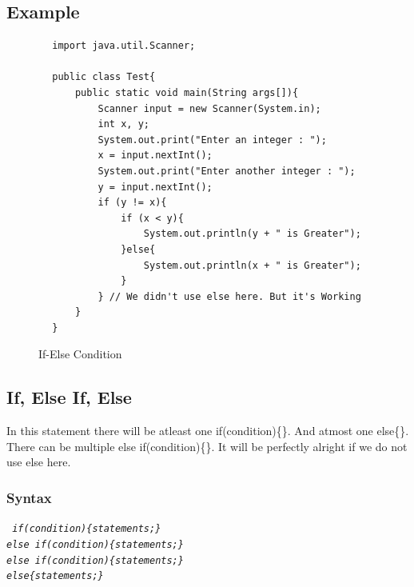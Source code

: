 \documentclass[A4 paper,openany]{book}  %
\begin{document}
\subsection{Example}
\begin{center}
    \begin{verbatim}
        import java.util.Scanner;

        public class Test{
            public static void main(String args[]){
                Scanner input = new Scanner(System.in);
                int x, y;
                System.out.print("Enter an integer : ");
                x = input.nextInt();
                System.out.print("Enter another integer : ");
                y = input.nextInt();
                if (y != x){
                    if (x < y){
                        System.out.println(y + " is Greater");
                    }else{
                        System.out.println(x + " is Greater");
                    }
                } // We didn't use else here. But it's Working
            }
        }
    \end{verbatim}
\end{center}
% 
% 
\begin{figure}[htbp]
    \begin{center}
        \caption{If-Else Condition}
    \end{center}
\end{figure}
% 
% 
\subsection{If, Else If, Else}
In this statement there will be atleast one if(condition)\{\}. And atmost one else\{\}. There can be multiple else if(condition)\{\}. It will be perfectly alright if we do not use else here.
% 
% 
\subsubsection{Syntax}
\begin{center}
    \tt{
        \textit{if(condition)\{statements;\}\\else if(condition)\{statements;\}\\else if(condition)\{statements;\}\\else\{statements;\}}
    }
\end{center}
% 
% 
\end{document}
